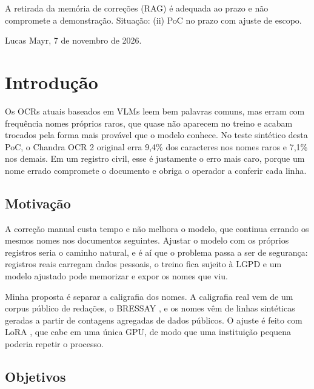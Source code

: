 \documentclass[12pt,a4paper]{article}
\begin{document}
A retirada da memória de correções (RAG) é adequada ao prazo e não compromete a demonstração. Situação: (ii) PoC no prazo com ajuste de escopo.

Lucas Mayr, 7 de novembro de 2026.

\section{Introdução}
\label{sec:introducao}

Os OCRs atuais baseados em VLMs leem bem palavras comuns, mas erram com frequência nomes próprios raros, que quase não aparecem no treino e acabam trocados pela forma mais provável que o modelo conhece. No teste sintético desta PoC, o Chandra OCR 2 original erra 9,4\% dos caracteres nos nomes raros e 7,1\% nos demais. Em um registro civil, esse é justamente o erro mais caro, porque um nome errado compromete o documento e obriga o operador a conferir cada linha.

\subsection{Motivação}

A correção manual custa tempo e não melhora o modelo, que continua errando os mesmos nomes nos documentos seguintes. Ajustar o modelo com os próprios registros seria o caminho natural, e é aí que o problema passa a ser de segurança: registros reais carregam dados pessoais, o treino fica sujeito à LGPD e um modelo ajustado pode memorizar e expor os nomes que viu.

Minha proposta é separar a caligrafia dos nomes. A caligrafia real vem de um corpus público de redações, o BRESSAY \cite{bressay2023}, e os nomes vêm de linhas sintéticas geradas a partir de contagens agregadas de dados públicos. O ajuste é feito com LoRA \cite{lora2022}, que cabe em uma única GPU, de modo que uma instituição pequena poderia repetir o processo.

\subsection{Objetivos}
\end{document}
